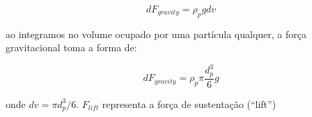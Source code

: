 \begin{equation}
	dF_{gravity}
	=
	\rho_p g dv
\end{equation}

ao integramos no volume ocupado por uma partícula qualquer, a força
gravitacional toma a forma de:

\begin{equation}
	dF_{gravity}
	=
	\rho_p \pi \frac{d_p^3}{6} g
\end{equation}

\noindent onde $dv=\pi d_p^3/6$. $F_{lift}$ representa a força de
sustentação (``lift'')












